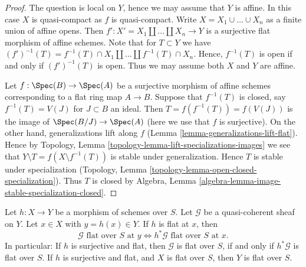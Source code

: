 \begin{proof}
The question is local on $Y$, hence we may assume that $Y$ is affine.
In this case $X$ is quasi-compact as $f$ is quasi-compact.
Write $X = X_1 \cup \ldots \cup X_n$ as a finite union of affine opens.
Then $f' : X' = X_1 \amalg \ldots \amalg X_n \to Y$ is a surjective
flat morphism of affine schemes. Note that for $T \subset Y$ we have
$(f')^{-1}(T) = f^{-1}(T) \cap X_1 \amalg \ldots \amalg f^{-1}(T) \cap X_n$.
Hence, $f^{-1}(T)$ is open if and only if $(f')^{-1}(T)$ is open.
Thus we may assume both $X$ and $Y$ are affine.

\medskip\noindent
Let $f : \Spec(B) \to \Spec(A)$ be a surjective morphism of affine schemes
corresponding to a flat ring map $A \to B$. Suppose that $f^{-1}(T)$ is
closed, say $f^{-1}(T) = V(J)$ for $J \subset B$ an ideal. Then
$T = f(f^{-1}(T)) = f(V(J))$ is the image of $\Spec(B/J) \to \Spec(A)$
(here we use that $f$ is surjective). On the other hand, generalizations
lift along $f$ (Lemma \ref{lemma-generalizations-lift-flat}).
Hence by Topology, Lemma \ref{topology-lemma-lift-specializations-images}
we see that $Y \setminus T = f(X \setminus f^{-1}(T))$ is stable under
generalization. Hence $T$ is stable under specialization
(Topology, Lemma \ref{topology-lemma-open-closed-specialization}).
Thus $T$ is closed by
Algebra, Lemma \ref{algebra-lemma-image-stable-specialization-closed}.
\end{proof}

\begin{lemma}
\label{lemma-flat-permanence}
Let $h : X \to Y$ be a morphism of schemes over $S$.
Let $\mathcal{G}$ be a quasi-coherent sheaf on $Y$.
Let $x \in X$ with $y = h(x) \in Y$. If $h$ is flat at $x$, then
$$
\mathcal{G}\text{ flat over }S\text{ at }y
\Leftrightarrow
h^*\mathcal{G}\text{ flat over }S\text{ at }x.
$$
In particular: If $h$ is surjective and flat, then
$\mathcal{G}$ is flat over $S$, if and only if
$h^*\mathcal{G}$ is flat over $S$. If $h$ is surjective and
flat, and $X$ is flat over $S$, then $Y$ is flat over $S$.
\end{lemma}

